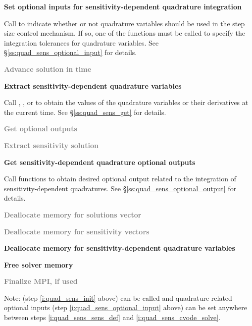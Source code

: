 \begin{Steps}
\item\label{i:quad_sens_optional_input}
  {\bf Set optional inputs for sensitivity-dependent quadrature integration}

  Call  to indicate whether or not quadrature variables
  should be used in the step size control mechanism. If so, one of the 
   functions  must be called to specify the integration 
  tolerances for quadrature variables.
  See \S\ref{ss:quad_sens_optional_input} for details.

\item\label{i:quad_sens_cvode_solve}
  \textcolor{gray}{\bf Advance solution in time}

\item
  {\bf Extract sensitivity-dependent quadrature variables}

  Call , ,  or 
   to obtain the values of the quadrature variables or their 
  derivatives at the current time. See \S\ref{ss:quad_sens_get} for details.

\item
  \textcolor{gray}{\bf Get optional outputs}

\item
  \textcolor{gray}{\bf Extract sensitivity solution}

\item
  {\bf Get sensitivity-dependent quadrature optional outputs}

  Call  functions to obtain desired optional output related
  to the integration of sensitivity-dependent quadratures.
  See \S\ref{ss:quad_sens_optional_output} for details.

\item
  \textcolor{gray}{\bf Deallocate memory for solutions vector}

\item 
  \textcolor{gray}{\bf Deallocate memory for sensitivity vectors}

\item
  {\bf Deallocate memory for sensitivity-dependent quadrature variables}
  
\item
  {\bf Free solver memory}

\item 
  \textcolor{gray}{\bf Finalize MPI, if used}
  
\end{Steps}
Note:  (step \ref{i:quad_sens_init} above) can
be called and quadrature-related optional inputs (step
\ref{i:quad_sens_optional_input} above) can be set anywhere between
steps \ref{i:quad_sens_sens_def} and \ref{i:quad_sens_cvode_solve}.

